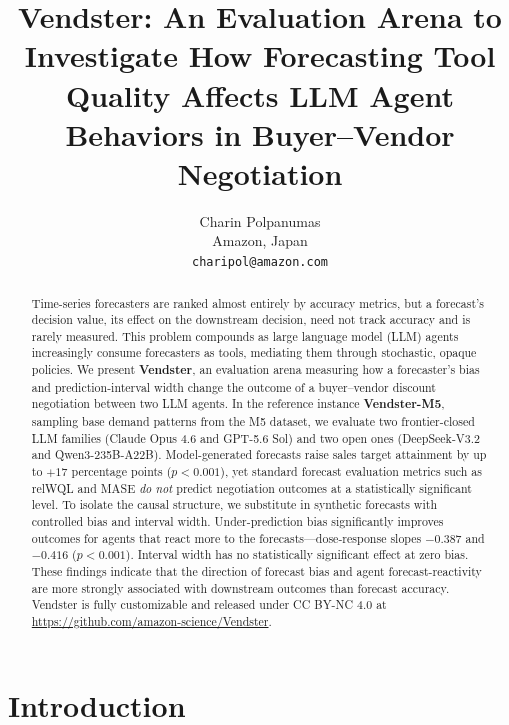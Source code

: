 \documentclass{article}
\title{Vendster: An Evaluation Arena to Investigate How Forecasting Tool Quality
Affects LLM Agent Behaviors in Buyer--Vendor Negotiation}
\author{%
  Charin Polpanumas \\
  Amazon, Japan \\
  \texttt{charipol@amazon.com}
}
\begin{document}
\maketitle

\begin{abstract}
Time-series forecasters are ranked almost entirely by accuracy metrics, but a forecast's decision value, its effect on the downstream decision, need not track accuracy and is rarely measured. This problem compounds as large language model (LLM) agents increasingly consume forecasters as tools, mediating them through stochastic, opaque policies. We present \textbf{Vendster}, an evaluation arena measuring how a forecaster's bias and prediction-interval width change the outcome of a buyer--vendor discount negotiation between two LLM agents. In the reference instance \textbf{Vendster-M5}, sampling base demand patterns from the M5 dataset, we evaluate two frontier-closed LLM families (Claude Opus 4.6 and GPT-5.6 Sol) and two open ones (DeepSeek-V3.2 and Qwen3-235B-A22B). Model-generated forecasts raise sales target attainment by up to $+17$ percentage points ($p<0.001$), yet standard forecast evaluation metrics such as relWQL and MASE \emph{do not} predict negotiation outcomes at a statistically significant level. To isolate the causal structure, we substitute in synthetic forecasts with controlled bias and interval width. Under-prediction bias significantly improves outcomes for agents that react more to the forecasts---dose-response slopes $-0.387$ and $-0.416$ ($p<0.001$). Interval width has no statistically significant effect at zero bias. These findings indicate that the direction of forecast bias and agent forecast-reactivity are more strongly associated with downstream outcomes than forecast accuracy. Vendster is fully customizable and released under CC BY-NC 4.0 at \url{https://github.com/amazon-science/Vendster}.
\end{abstract}

\section{Introduction}
\end{document}
